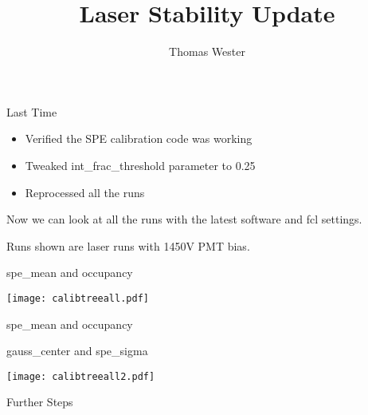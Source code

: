 \documentclass[12pt,t]{beamer}
\title{Laser Stability Update}
\subtitle{}
\author{Thomas Wester}
\institute{\today}
\date{}
\begin{document}
{
\frame{\titlepage}

\begin{frame}{Last Time}
	\vspace{3em}
	\begin{itemize}
		\item Verified the SPE calibration code was working
		\item Tweaked int\_frac\_threshold parameter to 0.25
		\item Reprocessed all the runs
	\end{itemize}
	
	\vspace{1em}
	
	Now we can look at all the runs with the latest software and fcl settings.
	
	Runs shown are laser runs with 1450V PMT bias.
	
\end{frame}

\begin{frame}{spe\_mean and occupancy}
	\vspace{-1.1em}
	\begin{center}
	\hspace*{-0.3in}
		\texttt{[image: calibtreeall.pdf]}
	\end{center}
\end{frame}

\begin{frame}{spe\_mean and occupancy}

\end{frame}

\begin{frame}{gauss\_center and spe\_sigma}
	\vspace{-1.1em}
	\begin{center}
	\hspace*{-0.3in}
		\texttt{[image: calibtreeall2.pdf]}
	\end{center}
\end{frame}

\begin{frame}{Further Steps}


\end{frame}}
\end{document}
